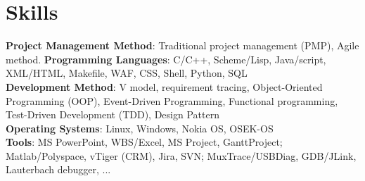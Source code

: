 
\section{Skills}
\textbf{Project Management Method}: Traditional project management (PMP), Agile method.
\textbf{Programming Languages}: C/C++, Scheme/Lisp, Java/script, XML/HTML, Makefile, WAF, CSS, Shell, Python, SQL\\
\textbf{Development Method}:
V model, requirement tracing,
Object-Oriented Programming (OOP),
Event-Driven Programming,
Functional programming,
Test-Driven Development (TDD),
Design Pattern\\
\textbf{Operating Systems}: Linux, Windows, Nokia OS, OSEK-OS\\
\textbf{Tools}:
MS PowerPoint,
WBS/Excel, MS Project, GanttProject;
Matlab/Polyspace,
vTiger (CRM), Jira, SVN;
MuxTrace/USBDiag, GDB/JLink, Lauterbach debugger, ...

